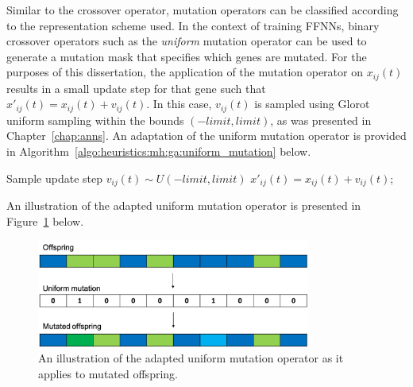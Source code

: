 Similar to the crossover operator, mutation operators can be classified according to the representation scheme used. In the context of training
\acp{FFNN}, binary crossover operators such as the \textit{uniform} mutation operator can be used to generate a mutation mask that specifies which genes are mutated. For the purposes of this dissertation, the application of the mutation operator on $x_{ij}(t)$ results in a small update step for that gene such that $x'_{ij}(t) = x_{ij}(t) + v_{ij}(t)$. In this case, $v_{ij}(t)$ is sampled using Glorot uniform sampling within the bounds $(-limit, limit)$, as was presented in Chapter~\ref{chap:anns}. An adaptation of the uniform mutation operator is provided in Algorithm~\ref{algo:heuristics:mh:ga:uniform_mutation} below.

\begin{algorithm}[htb]
      \caption{The pseudo-code for the uniform mutation operator as used by \acp{GA}.}
      \label{algo:heuristics:mh:ga:uniform_mutation}
      \begin{algorithmic}
            \State Sample update step $v_{ij}(t) \sim U(-limit, limit)$
            \State $x'_{ij}(t) = x_{ij}(t) + v_{ij}(t)$;
            \EndIf
            \EndFor
            \EndFor
            \State
      \end{algorithmic}
\end{algorithm}

An illustration of the adapted uniform mutation operator is presented in Figure~\ref{fig:heuristics:mh:ga:uniform_mutation} below.

\begin{figure}[htbp]
      \centering
      \includegraphics[width=0.8\textwidth]{images/uniform_mutation.pdf}
      \caption{An illustration of the adapted uniform mutation operator as it applies to mutated offspring.}
      \label{fig:heuristics:mh:ga:uniform_mutation}
\end{figure}

